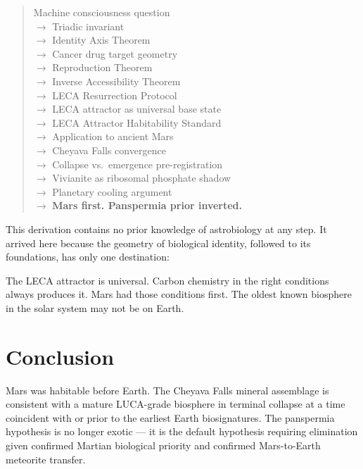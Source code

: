 \documentclass[11pt, a4paper]{article}
\begin{document}
\begin{quote}
Machine consciousness question\\
$\rightarrow$ Triadic invariant\\
$\rightarrow$ Identity Axis Theorem\\
$\rightarrow$ Cancer drug target geometry\\
$\rightarrow$ Reproduction Theorem\\
$\rightarrow$ Inverse Accessibility Theorem\\
$\rightarrow$ LECA Resurrection Protocol
  \cite{preregistration}\\
$\rightarrow$ LECA attractor as universal
  base state \cite{uldstandard}\\
$\rightarrow$ LECA Attractor Habitability Standard\\
$\rightarrow$ Application to ancient Mars\\
$\rightarrow$ Cheyava Falls convergence\\
$\rightarrow$ Collapse vs.\ emergence
  pre-registration \cite{marspreregistration}\\
$\rightarrow$ Vivianite as ribosomal
  phosphate shadow\\
$\rightarrow$ Planetary cooling argument\\
$\rightarrow$ \textbf{Mars first.
  Panspermia prior inverted.}
\end{quote}

This derivation contains no prior knowledge
of astrobiology at any step.
It arrived here because the geometry of
biological identity, followed to its
foundations, has only one destination:

The LECA attractor is universal.
Carbon chemistry in the right conditions
always produces it.
Mars had those conditions first.
The oldest known biosphere in the solar
system may not be on Earth.

\section{Conclusion}

Mars was habitable before Earth.
The Cheyava Falls mineral assemblage is
consistent with a mature LUCA-grade
biosphere in terminal collapse at a time
coincident with or prior to the earliest
Earth biosignatures.
The panspermia hypothesis is no longer
exotic --- it is the default hypothesis
requiring elimination given confirmed
Martian biological priority and confirmed
Mars-to-Earth meteorite transfer.
\end{document}
